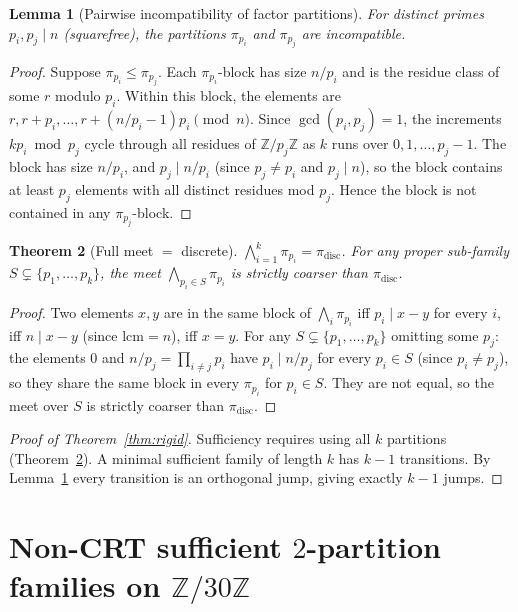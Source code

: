 \documentclass[11pt,reqno]{amsart}
\theoremstyle{plain}
\newtheorem{theorem}{Theorem}
\newtheorem{lemma}[theorem]{Lemma}
\theoremstyle{definition}
\newcommand{\Z}{\mathbb{Z}}
\newcommand{\disc}{\mathrm{disc}}
\newcommand{\lcm}{\mathrm{lcm}}
\begin{document}
\begin{lemma}[Pairwise incompatibility of factor partitions] \label{lem:pwise-incomp}
For distinct primes $p_i, p_j \mid n$ (squarefree), the partitions $\pi_{p_i}$ and $\pi_{p_j}$ are incompatible.
\end{lemma}

\begin{proof}
Suppose $\pi_{p_i} \leq \pi_{p_j}$. Each $\pi_{p_i}$-block has size $n/p_i$ and is the residue class of some $r$ modulo $p_i$. Within this block, the elements are $r, r + p_i, \ldots, r + (n/p_i - 1) p_i \pmod n$. Since $\gcd(p_i, p_j) = 1$, the increments $k p_i \bmod p_j$ cycle through all residues of $\Z/p_j\Z$ as $k$ runs over $0, 1, \ldots, p_j - 1$. The block has size $n/p_i$, and $p_j \mid n/p_i$ (since $p_j \neq p_i$ and $p_j \mid n$), so the block contains at least $p_j$ elements with all distinct residues mod $p_j$. Hence the block is not contained in any $\pi_{p_j}$-block.
\end{proof}

\begin{theorem}[Full meet $=$ discrete] \label{thm:full-meet}
$\bigwedge_{i=1}^{k} \pi_{p_i} = \pi_{\disc}$. For any proper sub-family $S \subsetneq \{p_1,\ldots,p_k\}$, the meet $\bigwedge_{p_i \in S} \pi_{p_i}$ is strictly coarser than $\pi_{\disc}$.
\end{theorem}

\begin{proof}
Two elements $x, y$ are in the same block of $\bigwedge_{i} \pi_{p_i}$ iff $p_i \mid x - y$ for every $i$, iff $n \mid x - y$ (since $\lcm = n$), iff $x = y$. For any $S \subsetneq \{p_1,\ldots,p_k\}$ omitting some $p_j$: the elements $0$ and $n/p_j = \prod_{i \neq j} p_i$ have $p_i \mid n/p_j$ for every $p_i \in S$ (since $p_i \neq p_j$), so they share the same block in every $\pi_{p_i}$ for $p_i \in S$. They are not equal, so the meet over $S$ is strictly coarser than $\pi_{\disc}$.
\end{proof}

\begin{proof}[Proof of Theorem~\ref{thm:rigid}]
Sufficiency requires using all $k$ partitions (Theorem~\ref{thm:full-meet}). A minimal sufficient family of length $k$ has $k-1$ transitions. By Lemma~\ref{lem:pwise-incomp} every transition is an orthogonal jump, giving exactly $k-1$ jumps.
\end{proof}

\section{Non-CRT sufficient $2$-partition families on $\Z/30\Z$} \label{sec:n30}
\end{document}
